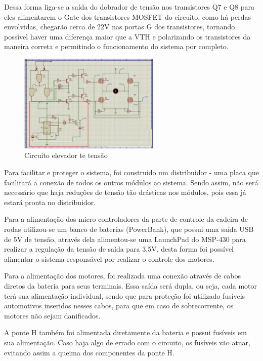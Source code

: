 			Dessa forma liga-se a saída do dobrador de tensão nos transistores Q7 e Q8 para eles alimentarem o Gate dos transistores MOSFET do circuito, como há perdas envolvidas, chegarão cerca de 22V nas portas G dos transistores, tornando possível haver uma diferença maior que a VTH e polarizando os transistores da maneira correta e permitindo o funcionamento do sistema por completo.

			\begin{figure}[!htb]
				\centering
				\includegraphics[width=0.6\textwidth]{figuras/referencialteorico/figurax_4}
				\caption{Circuito elevador te tensão}
				\label{fig:figx+4}
			\end{figure}

			Para facilitar e proteger o sistema, foi construido um distribuidor -  uma placa que facilitará a conexão de todos os outros módulos ao sistema. Sendo assim, não será necessário que haja reduções de tensão tão drásticas nos módulos, pois essa já estará pronta no distribuidor.

			Para a alimentação dos micro controladores da parte de controle da cadeira de rodas utilizou-se um banco de baterias (PowerBank), que possui uma saída USB de 5V de tensão, através dela alimentou-se uma LaunchPad do MSP-430 para realizar a regulação da tensão de saída para 3,5V, desta forma foi possível alimentar o sistema responsável por realizar o controle dos motores.

			Para a alimentação dos motores, foi realizada uma conexão através de cabos diretos da bateria para seus terminais. Essa saída será dupla, ou seja, cada motor terá sua alimentação individual, sendo que para proteção foi utilizado fusíveis automotivos inseridos nesses cabos, para que em caso de sobrecorrente, os motores não sejam danificados.

			A ponte H também foi alimentada diretamente da bateria e possui fusíveis em sua alimentação. Caso haja algo de errado com o circuito, os fusíveis vão atuar, evitando assim a queima dos componentes da ponte H.

